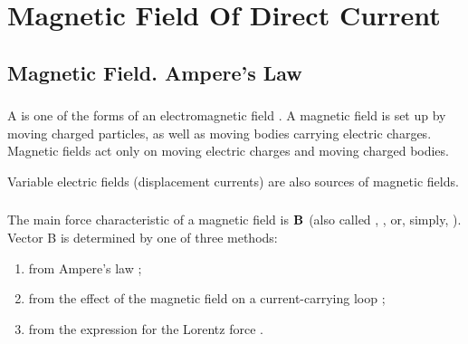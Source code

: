 





\chapter{Magnetic Field Of Direct Current}
\label{ch-23}

\section{Magnetic Field. Ampere's Law}
\label{sec-23.1}

\subsection{}\label{23.1.1} 

A  is one of the forms of an electromagnetic field . A magnetic field is set up by moving charged particles, as well as moving bodies carrying electric charges. Magnetic fields act only on moving electric charges and moving charged bodies.

Variable electric fields (displacement currents)  are
also sources of magnetic fields.

\subsection{}\label{23.1.2} The main force characteristic of a magnetic field is
 $\vb{B}$ (also called , , or, simply, ). Vector B is determined by one of three methods:
\begin{enumerate}[label= (\alph*)]
\item from Ampere's law ;
\item from the effect of the magnetic field on a current-carrying loop ;
\item from the expression for the Lorentz force .
\end{enumerate}

